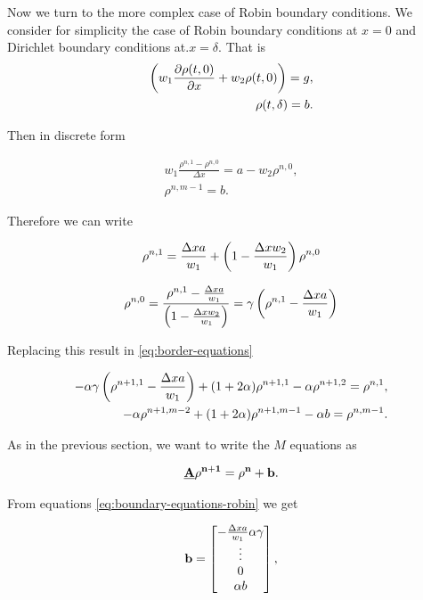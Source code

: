 Now we turn to the more complex case of Robin boundary conditions. We consider for simplicity the case of Robin boundary conditions at $x=0$ and Dirichlet boundary conditions at.$x = \delta$. That is
\begin{align}
	\left({w_1\frac{\partial \rho(t,0)}{\partial x}+w_2\rho(t,0)}\right) = g,\\
	\rho(t,\delta) = b.
\end{align}

Then in discrete form 

\begin{align}
    w_1\frac{\rho^{n, 1}-\rho^{n,0}}{\Delta x} = a - w_2\rho^{n, 0}, \\
    \rho^{n, m-1} = b.
\end{align}

Therefore we can write

\begin{align}
	\rho^{n,1} = \frac{\Delta x a }{w_1} + \left({1 - \frac{\Delta x w_2 }{w_1}}\right)\rho^{n, 0}\\
\end{align}

\begin{align}
	\rho^{n, 0} = \frac{\rho^{n,1} - \frac{\Delta x a }{w_1}}{\left({1 - \frac{\Delta x w_2 }{w_1}}\right)} = \gamma\left({\rho^{n,1} - \frac{\Delta x a }{w_1}}\right) \\
\end{align}

Replacing this result in \ref{eq:border-equations} 

\begin{align}
	\label{eq:boundary-equations-robin}
    -\alpha \gamma \left({\rho^{n+1, 1} - \frac{\Delta x a }{w_1}}\right)  + ( 1 + 2\alpha ) \rho^{n+1,1} -\alpha \rho^{n+1,2} = \rho^{n,1},\\
    -\alpha \rho^{n+1,m-2} + ( 1 + 2\alpha ) \rho^{n+1,m-1} - \alpha b = \rho^{n,m-1}.
\end{align}

As in the previous section, we want to write the $M$ equations as 

\begin{align}
    \bf{\underline{A}} \bf{\rho^{n+1}}  = \bf{\rho^n} + \bf{b}.
\end{align}

From equations \ref{eq:boundary-equations-robin} we get

\begin{align}
    \bf{b} = \begin{bmatrix}
                    -\frac{\Delta x a }{w_1}\alpha\gamma\\
                    \vdots \\
                    0 \\
                    \alpha b 
                    \end{bmatrix},
\end{align}


